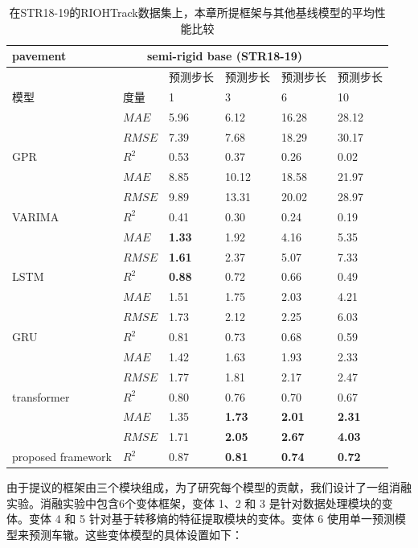 \begin{table}[htbp]\small
\centering
\caption{在STR18-19的RIOHTrack数据集上，本章所提框架与其他基线模型的平均性能比较}
\begin{tabular}{llllll}
 \hline
  pavement & \multicolumn{4}{c}{semi-rigid base (STR18-19)} \\
  \hline
  ~ & ~ & 预测步长 & 预测步长 & 预测步长 & 预测步长\\
  \hline
  模型 & 度量 & 1 & 3 & 6 & 10 \\
  \hline
  ~ & $MAE$ & 5.96 & 6.12 & 16.28 & 28.12 \\
  ~ & $RMSE$ & 7.39 & 7.68 & 18.29 & 30.17 \\

  GPR & $R^{2}$ & 0.53 & 0.37 & 0.26 & 0.02 \\
  \hline
  ~ & $MAE$ & 8.85 & 10.12 & 18.58 & 21.97 \\
  ~ & $RMSE$ & 9.89 & 13.31 & 20.02 & 28.97 \\

  VARIMA & $R^{2}$ & 0.41 & 0.30 & 0.24 & 0.19 \\
  \hline
  ~ & $MAE$ & \textbf{1.33} & 1.92 & 4.16 & 5.35 \\
  ~ & $RMSE$ & \textbf{1.61} & 2.37 & 5.07 & 7.33 \\
  LSTM &  $R^{2}$ & \textbf{0.88} & 0.72 & 0.66 & 0.49\\
  \hline
  ~ & $MAE$ & 1.51 & 1.75 & 2.03 & 4.21 \\
  ~ & $RMSE$ & 1.73 & 2.12 & 2.25 & 6.03 \\
  GRU &  $R^{2}$ & 0.81 & 0.73 & 0.68 & 0.59 \\
  \hline
  ~ & $MAE$ & 1.42 & 1.63 & 1.93 & 2.33 \\
  ~ & $RMSE$ & 1.77 & 1.81 & 2.17 & 2.47 \\
  transformer & $R^{2}$ & 0.80 & 0.76 & 0.70 & 0.67 \\
  \hline
  ~ & $MAE$ & 1.35 & \textbf{1.73} & \textbf{2.01}& \textbf{2.31}  \\
  ~ & $RMSE$ & 1.71 & \textbf{2.05} & \textbf{2.67}& \textbf{4.03} \\
  proposed framework & $R^{2}$& 0.87 & \textbf{0.81} & \textbf{0.74} & \textbf{0.72} \\
  \hline
\end{tabular}
\end{table}

由于提议的框架由三个模块组成，为了研究每个模型的贡献，我们设计了一组消融实验。消融实验中包含6个变体框架，变体 1、2 和 3 是针对数据处理模块的变体。变体 4 和 5 针对基于转移熵的特征提取模块的变体。变体 6 使用单一预测模型来预测车辙。这些变体模型的具体设置如下：

